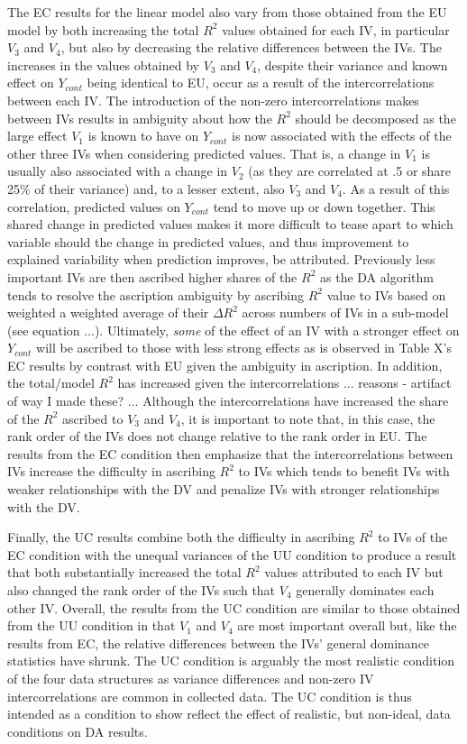 \documentclass[ShortAfour,times,sageapa]{sagej}
\begin{document}
	The EC results for the linear model also vary from those obtained from the EU model by both increasing the total $R^2$ values obtained for each IV, in particular $V_3$ and $V_4$, but also by decreasing the relative differences between the IVs.
	The increases in the values obtained by $V_3$ and $V_4$, despite their variance and known effect on $Y_{cont}$ being identical to EU, occur as a result of the intercorrelations between each IV.  
	The introduction of the non-zero intercorrelations makes between IVs results in ambiguity about how the $R^2$ should be decomposed as the large effect $V_1$ is known to have on $Y_{cont}$ is now associated with the effects of the other three IVs when considering predicted values.  
	That is, a change in $V_1$ is usually also associated with a change in $V_2$ (as they are correlated at .5 or share 25\% of their variance) and, to a lesser extent, also $V_3$ and $V_4$.
	As a result of this correlation, predicted values on $Y_{cont}$ tend to move up or down together.
	This shared change in predicted values makes it more difficult to tease apart to which variable should the change in predicted values, and thus improvement to explained variability when prediction improves, be attributed.
	Previously less important IVs are then ascribed higher shares of the $R^2$ as the DA algorithm tends to resolve the ascription ambiguity by ascribing $R^2$ value to IVs based on weighted a weighted average of their $\Delta R^2$ across numbers of IVs in a sub-model (see equation ...).  
	Ultimately, \emph{some} of the effect of an IV with a stronger effect on $Y_{cont}$ will be ascribed to those with less strong effects as is observed in Table X's EC results by contrast with EU given the ambiguity in ascription.
	In addition, the total/model $R^2$ has increased given the intercorrelations ... reasons - artifact of way I made these? ...
	Although the intercorrelations have increased the share of the $R^2$ ascribed to $V_3$ and $V_4$, it is important to note that, in this case, the rank order of the IVs does not change relative to the rank order in EU.
	The results from the EC condition then emphasize that the intercorrelations between IVs increase the difficulty in ascribing $R^2$ to IVs which tends to benefit IVs with weaker relationships with the DV and penalize IVs with stronger relationships with the DV.	
	
	Finally, the UC results combine both the difficulty in ascribing $R^2$ to IVs of the EC condition with the unequal variances of the UU condition to produce a result that both substantially increased the total $R^2$ values attributed to each IV but also changed the rank order of the IVs such that $V_4$ generally dominates each other IV.
	Overall, the results from the UC condition are similar to those obtained from the UU condition in that $V_1$ and $V_4$ are most important overall but, like the results from EC, the relative differences between the IVs' general dominance statistics have shrunk.
	The UC condition is arguably the most realistic condition of the four data structures as variance differences and non-zero IV intercorrelations are common in collected data.
	The UC condition is thus intended as a condition to show reflect the effect of realistic, but non-ideal, data conditions on DA results.
	
\end{document}

